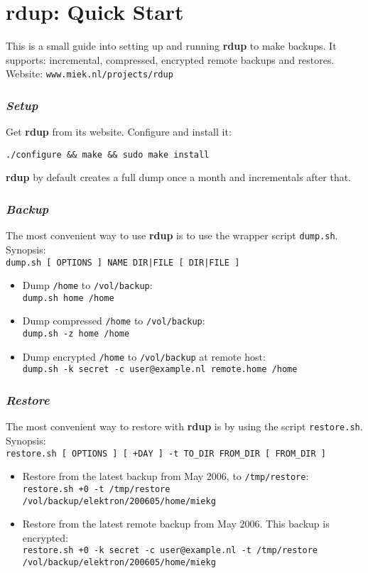 \documentclass[a4paper, openany]{memoir}
\newcommand{\rdup}{\textbf{rdup}}
\newcommand{\cmd}[1]{\texttt{#1}}
\newcommand{\url}[1]{\texttt{#1}}
\newcommand{\path}[1]{\texttt{#1}}
\begin{document}
\chapter*{\rdup: Quick Start}
This is a small guide into setting up and running \rdup{} to make backups. It
supports: incremental, compressed, encrypted remote backups and
restores. Website: \url{www.miek.nl/projects/rdup}

\subsection*{\textit{Setup}}
Get \rdup{} from its website. Configure and install it:
\begin{verbatim}
./configure && make && sudo make install
\end{verbatim}
\rdup{} by default creates a full dump once a month and incrementals
after that.

\subsection*{\textit{Backup}}
The most convenient way to use \rdup{} is to use the wrapper
script \cmd{dump.sh}. Synopsis:\\
\cmd{dump.sh [ OPTIONS ] NAME DIR|FILE [ DIR|FILE ]}
\begin{itemize}
\item
Dump \path{/home} to \path{/vol/backup}:\\
\cmd{dump.sh home /home} 
\item
Dump compressed \path{/home} to \path{/vol/backup}:\\
\cmd{dump.sh -z home /home} 
\item
Dump encrypted \path{/home} to \path{/vol/backup} at remote
host:\\
\cmd{dump.sh -k secret -c user@example.nl remote.home /home}
\end{itemize}

\subsection*{\textit{Restore}}
The most convenient way to restore with \rdup{} is by using
the script \cmd{restore.sh}. Synopsis:\\
\cmd{restore.sh [ OPTIONS ] [ +DAY ] -t TO\_DIR FROM\_DIR [ FROM\_DIR ]}
\begin{itemize}
\item
Restore from the latest backup from May 2006, to \path{/tmp/restore}:\\
\cmd{restore.sh +0 -t /tmp/restore \\
/vol/backup/elektron/200605/home/miekg}
\item
Restore from the latest remote backup from May 2006. This backup
is encrypted:\\
\cmd{restore.sh +0 -k secret -c user@example.nl -t /tmp/restore \\
/vol/backup/elektron/200605/home/miekg}
\end{itemize}
\end{document}
